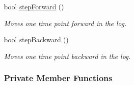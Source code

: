 \begin{DoxyCompactItemize}
bool \hyperlink{structVisualLog_ab0259d2a585759ad9e5da72ad518bc9f}{step\+Forward} ()
\begin{DoxyCompactList}\small\item\em Moves one time point forward in the log. \end{DoxyCompactList}\item 
bool \hyperlink{structVisualLog_ad4dc89d69777a281a84b52dba9339fff}{step\+Backward} ()
\begin{DoxyCompactList}\small\item\em Moves one time point backward in the log. \end{DoxyCompactList}\end{DoxyCompactItemize}
\subsubsection*{Private Member Functions}
